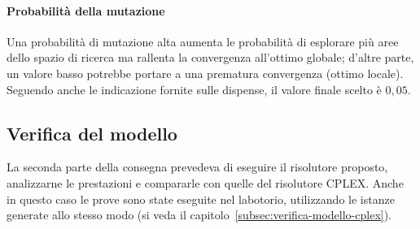 \paragraph{Probabilità della mutazione}
Una probabilità di mutazione alta aumenta le probabilità di esplorare più aree dello spazio di ricerca
ma rallenta la convergenza all'ottimo globale; d'altre parte, un valore basso potrebbe portare a una prematura convergenza (ottimo locale).
Seguendo anche le indicazione fornite sulle dispense, il valore finale scelto è $0,05$.
\subsection{Verifica del modello}\label{subsec:risultati-ga}
La seconda parte della consegna prevedeva di eseguire il risolutore proposto, analizzarne le prestazioni
e compararle con quelle del risolutore CPLEX.
Anche in questo caso le prove sono state eseguite nel labotorio, utilizzando le istanze generate
allo stesso modo (si veda il capitolo~\ref{subsec:verifica-modello-cplex}).

